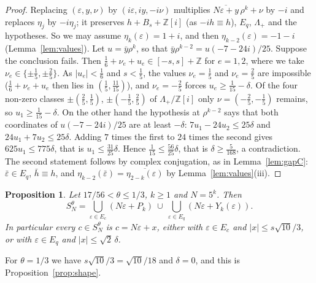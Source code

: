 \documentclass[11pt,a4paper]{amsart}
\newtheorem{proposition}{Proposition}
\theoremstyle{remark}
\newcommand{\Z}{\mathbb{Z}}
\begin{document}
\begin{proof}
Replacing $(\varepsilon,y,\nu)$ by $(i\varepsilon,iy,-i\nu)$ multiplies $\overline{N\varepsilon+y}\,\rho^k+\nu$ by
$-i$ and replaces $\eta_j$ by $-i\eta_j$; it preserves $h+B_s+\Z[i]$ (as $-ih\equiv h$), $E_q$, $\Lambda_+$ and the
hypotheses. So we may assume $\eta_k(\varepsilon)=1+i$, and then $\eta_{k-2}(\varepsilon)=-1-i$
(Lemma~\ref{lem:values}). Let $u=\bar y\rho^k$, so that $\bar y\rho^{k-2}=u(-7-24i)/25$. Suppose the conclusion
fails. Then $\frac16+\nu_e+u_e\in[-s,s]+\Z$ for $e=1,2$, where we take $\nu_e\in\{\pm\frac15,\pm\frac25\}$. As
$|u_e|<\frac16$ and $s<\frac15$, the values $\nu_e=\frac15$ and $\nu_e=\frac25$ are impossible ($\frac16+\nu_e+u_e$
then lies in $(\frac15,\frac{11}{15})$), and $\nu_e=-\frac25$ forces $u_e\ge\frac1{15}-\delta$. Of the four non-zero
classes $\pm(\frac25,\frac15)$, $\pm(-\frac15,\frac25)$ of $\Lambda_+/\Z[i]$ only $\nu=(-\frac25,-\frac15)$ remains,
so $u_1\ge\frac1{15}-\delta$. On the other hand the hypothesis at $\rho^{k-2}$ says that both coordinates of
$u(-7-24i)/25$ are at least $-\delta$: $7u_1-24u_2\le25\delta$ and $24u_1+7u_2\le25\delta$. Adding $7$ times the
first to $24$ times the second gives $625u_1\le775\delta$, that is $u_1\le\frac{31}{25}\delta$. Hence
$\frac1{15}\le\frac{56}{25}\delta$, that is $\delta\ge\frac5{168}$, a contradiction. The second statement follows by
complex conjugation, as in Lemma~\ref{lem:gapC}: $\bar\varepsilon\in E_q$, $\bar h\equiv h$, and
$\eta_{k-2}(\bar\varepsilon)=\overline{\eta_{2-k}(\varepsilon)}$ by Lemma~\ref{lem:values}(iii).
\end{proof}

\begin{proposition}\label{prop:probe}
Let $17/56<\theta\le1/3$, $k\ge1$ and $N=5^k$. Then
\[
S_N^\theta=\bigcup_{\varepsilon\in E_c}(N\varepsilon+P_k)\ \cup\ \bigcup_{\varepsilon\in E_q}(N\varepsilon+Y_k(\varepsilon)).
\]
In particular every $c\in S_N^\theta$ is $c=N\varepsilon+x$, either with $\varepsilon\in E_c$ and $|x|\le
s\sqrt{10}/3$, or with $\varepsilon\in E_q$ and $|x|\le\sqrt2\,\delta$.
\end{proposition}

For $\theta=1/3$ we have $s\sqrt{10}/3=\sqrt{10}/18$ and $\delta=0$, and this is Proposition~\ref{prop:shape}.
\end{document}
